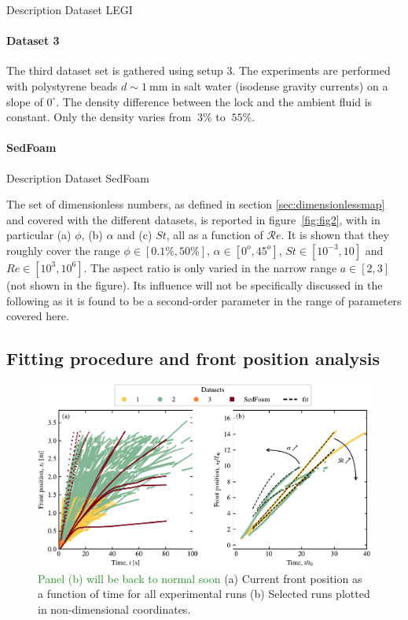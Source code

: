\documentclass[twocolumn]{article}
\newcommand*{\cyril}{\textcolor{ForestGreen}}
\begin{document}
Description Dataset LEGI

\paragraph{Dataset 3}

The third dataset set is gathered using setup 3.
The experiments are performed with polystyrene beads $d \sim 1~\textrm{mm}$ in salt water (isodense gravity currents) on a slope of $0^\circ$.  The density difference between the lock and the ambient fluid is constant. Only the density varies from $~3 \%$ to $~55 \%$.

\paragraph{SedFoam}

Description Dataset SedFoam

The set of dimensionless numbers, as defined in section \ref{sec:dimensionlessmap} and covered with the different datasets, is reported in figure~\ref{fig:fig2}, with in particular (a) $\phi$, (b) $\alpha$ and (c) $St$, all as a function of $\mathcal{R}e$.
It is shown that they roughly cover the range $\phi\in[0.1\%,50\%]$, $\alpha \in [0^o,45^o]$, $St\in[10^{-3}, 10]$ and $Re\in[10^3, 10^6]$. The aspect ratio is only varied in the narrow range $a\in[2,3]$ (not shown in the figure). Its influence will not be specifically discussed in the following as it is found to be a second-order parameter in the range of parameters covered here.

\subsection{Fitting procedure and front position analysis}

\begin{figure}[ht]
	\centering
	\includegraphics{figure3.pdf}
	\caption{\cyril{Panel (b) will be back to normal soon} (a) Current front position as a function of time for all experimental runs (b) Selected runs plotted in non-dimensional coordinates.}
	\label{fig:fig3}
\end{figure}
\end{document}
